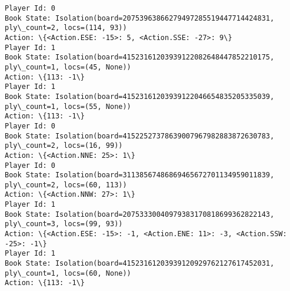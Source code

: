 \documentclass[11pt]{article}
\begin{document}
\begin{Verbatim}[commandchars=\\\{\}]
Player Id: 0
Book State: Isolation(board=20753963866279497285519447714424831, ply\_count=2, locs=(114, 93))
Action: \{<Action.ESE: -15>: 5, <Action.SSE: -27>: 9\}
Player Id: 1
Book State: Isolation(board=41523161203939122082648447852210175, ply\_count=1, locs=(45, None))
Action: \{113: -1\}
Player Id: 1
Book State: Isolation(board=41523161203939122046654835205335039, ply\_count=1, locs=(55, None))
Action: \{113: -1\}
Player Id: 0
Book State: Isolation(board=41522527378639007967982883872630783, ply\_count=2, locs=(16, 99))
Action: \{<Action.NNE: 25>: 1\}
Player Id: 0
Book State: Isolation(board=31138567486869465672701134959011839, ply\_count=2, locs=(60, 113))
Action: \{<Action.NNW: 27>: 1\}
Player Id: 1
Book State: Isolation(board=20753330040979383170818699362822143, ply\_count=3, locs=(99, 93))
Action: \{<Action.ESE: -15>: -1, <Action.ENE: 11>: -3, <Action.SSW: -25>: -1\}
Player Id: 1
Book State: Isolation(board=41523161203939120929762127617452031, ply\_count=1, locs=(60, None))
Action: \{113: -1\}


\end{Verbatim}
\end{document}

